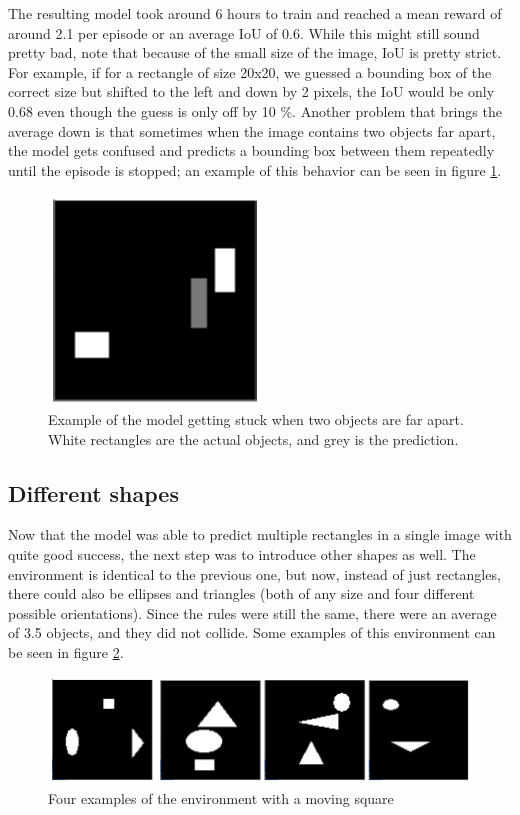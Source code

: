 \documentclass[
  digital,     %
  oneside,     %
  nosansbold,  %
  nocolorbold, %
  lof,         %
  lot,         %
]{fithesis4}
\begin{document}
The resulting model took around 6 hours to train and reached a mean reward of around 2.1 per episode or an average IoU of 0.6. While this might still sound pretty bad, note that because of the small size of the image, IoU is pretty strict. For example, if for a rectangle of size 20x20, we guessed a bounding box of the correct size but shifted to the left and down by 2 pixels, the IoU would be only 0.68 even though the guess is only off by 10  \%. Another problem that brings the average down is that sometimes when the image contains two objects far apart, the model gets confused and predicts a bounding box between them repeatedly until the episode is stopped; an example of this behavior can be seen in figure \ref{fig:v3_stuck}.

\begin{figure}
    \centering
    \includegraphics[width=0.5\linewidth]{results/v3_stuck.png}
    \caption{Example of the model getting stuck when two objects are far apart. White rectangles are the actual objects, and grey is the prediction.}
    \label{fig:v3_stuck}
\end{figure}

\subsection{Different shapes}
Now that the model was able to predict multiple rectangles in a single image with quite good success, the next step was to introduce other shapes as well. The environment is identical to the previous one, but now, instead of just rectangles, there could also be ellipses and triangles (both of any size and four different possible orientations). Since the rules were still the same, there were an average of 3.5 objects, and they did not collide. Some examples of this environment can be seen in figure \ref{fig:env4}.

\begin{figure}
    \includegraphics[width=1\linewidth]{env_examples/env4.png}
    \caption{Four examples of the environment with a moving square}
    \label{fig:env4}
\end{figure}
 
\end{document}

